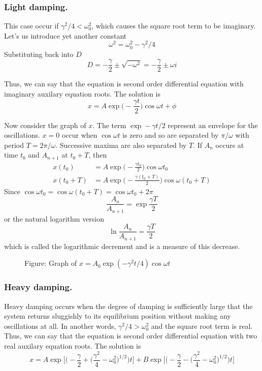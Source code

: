\documentclass[../../main.tex]{subfiles}
\begin{document}
\subsubsection{Light damping.} This case occur if $\gamma^2/4<\omega_0^2$, which causes the square root term to be imaginary. Let's us introduce yet another constant
\begin{equation*}
    \omega^2=\omega_0^2-\gamma^2/4
\end{equation*}
Substituting back into $D$
\begin{equation*}
    D=-\frac{\gamma}{2}\pm \sqrt{-\omega^2}=-\frac{\gamma}{2}\pm \omega i
\end{equation*}

Thus, we can say that the equation is second order differential equation with imaginary auxilary equation roots. The solution is
\begin{equation*}
    x=A\exp\biggl(-\frac{\gamma t}{2}\biggr)\cos\omega t +\phi
\end{equation*} 

Now consider the graph of $x$. The term $\exp -\gamma t/2$ represent an envelope for the oscillations. $x=0$ occur when $\cos\omega t$ is zero and so are separated by $\pi/\omega$ with period $T=2\pi/\omega$. Successive maxima are also separated by $T$. If $A_n$ occurs at time $t_0$ and $A_{n+1}$ at $t_0+T$, then 
\begin{align*}
    x(t_0)&=A\exp\biggl(-\frac{\gamma t_0}{2}\biggr)\cos\omega t_0\\
    x(t_0+T)&=A\exp\biggl(-\frac{\gamma (t_0+T)}{2}\biggr)\cos\omega (t_0+T)
\end{align*}
Since $\cos\omega t_0=\cos\omega (t_0+T)=\cos\omega t_0+2\pi$
\begin{equation*}
    \frac{A_n}{A_{n+1}}=\exp \frac{\gamma T}{2}
\end{equation*} 
or the natural logarithm version
\begin{equation*}
    \ln \frac{A_n}{A_{n+1}}=\frac{\gamma T}{2}
\end{equation*}
which is called the logarithmic decrement and is a measure of this decrease. 
\begin{figure}[b]
    \centering
    \caption*{Figure: Graph of $x=A_0\exp(-\gamma^2t/4)\cos \omega t$}
\end{figure}

\subsubsection{Heavy damping.} Heavy damping occurs when the degree of damping is sufficiently large that the system returns sluggishly to its equilibrium position without making any oscillations at all. In another words, $\gamma^2/4 > \omega_0^2$ and the square root term is real. Thus, we can say that the equation is second order differential equation with two real auxilary equation roots. The solution is
\begin{equation*}
    x=A\exp \biggl[\bigg(-\frac{\gamma}{2} + \big(\frac{\gamma^2}{4}-\omega_0^2\big)^{1/2}\bigg)t\biggr] +B \exp \biggl[\bigg(-\frac{\gamma}{2} - \big(\frac{\gamma^2}{4}-\omega_0^2\big)^{1/2}\bigg)t\biggr]
\end{equation*}
\end{document}

